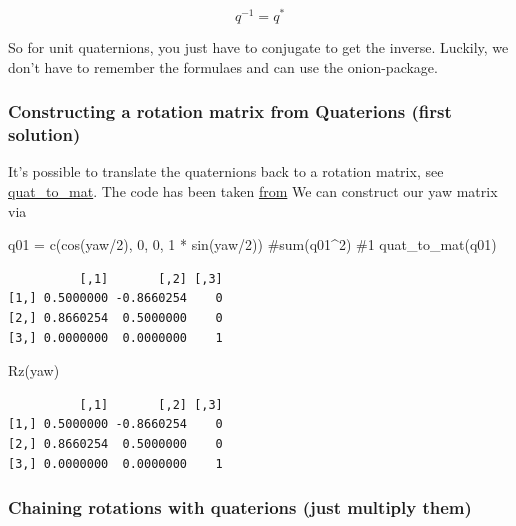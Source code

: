 \documentclass[
  letterpaper,
  DIV=11,
  numbers=noendperiod]{scrartcl}
\newenvironment{Shaded}{\begin{snugshade}}{\end{snugshade}}
\newcommand{\CommentTok}[1]{\textcolor[rgb]{0.37,0.37,0.37}{#1}}
\newcommand{\DecValTok}[1]{\textcolor[rgb]{0.68,0.00,0.00}{#1}}
\newcommand{\FunctionTok}[1]{\textcolor[rgb]{0.28,0.35,0.67}{#1}}
\newcommand{\NormalTok}[1]{\textcolor[rgb]{0.00,0.23,0.31}{#1}}
\newcommand{\OtherTok}[1]{\textcolor[rgb]{0.00,0.23,0.31}{#1}}
\newcommand{\SpecialCharTok}[1]{\textcolor[rgb]{0.37,0.37,0.37}{#1}}
\begin{document}
\[
q^{-1}=q^*
\]

So for unit quaternions, you just have to conjugate to get the inverse.
Luckily, we don't have to remember the formulaes and can use the
onion-package.

\hypertarget{constructing-a-rotation-matrix-from-quaterions-first-solution}{%
\subsubsection{Constructing a rotation matrix from Quaterions (first
solution)}\label{constructing-a-rotation-matrix-from-quaterions-first-solution}}

It's possible to translate the quaternions back to a rotation matrix,
see
\href{https://github.com/oduerr/gesture/blob/main/R/rotation_utils.R}{quat\_to\_mat}.
The code has been taken
\href{https://automaticaddison.com/how-to-convert-a-quaternion-to-a-rotation-matrix/}{from}
We can construct our yaw matrix via

\begin{Shaded}
\begin{Highlighting}[]
\NormalTok{  q01 }\OtherTok{=} \FunctionTok{c}\NormalTok{(}\FunctionTok{cos}\NormalTok{(yaw}\SpecialCharTok{/}\DecValTok{2}\NormalTok{), }\DecValTok{0}\NormalTok{, }\DecValTok{0}\NormalTok{, }\DecValTok{1} \SpecialCharTok{*} \FunctionTok{sin}\NormalTok{(yaw}\SpecialCharTok{/}\DecValTok{2}\NormalTok{))}
  \CommentTok{\#sum(q01\^{}2) \#1}
  \FunctionTok{quat\_to\_mat}\NormalTok{(q01)}
\end{Highlighting}
\end{Shaded}

\begin{verbatim}
          [,1]       [,2] [,3]
[1,] 0.5000000 -0.8660254    0
[2,] 0.8660254  0.5000000    0
[3,] 0.0000000  0.0000000    1
\end{verbatim}

\begin{Shaded}
\begin{Highlighting}[]
  \FunctionTok{Rz}\NormalTok{(yaw)}
\end{Highlighting}
\end{Shaded}

\begin{verbatim}
          [,1]       [,2] [,3]
[1,] 0.5000000 -0.8660254    0
[2,] 0.8660254  0.5000000    0
[3,] 0.0000000  0.0000000    1
\end{verbatim}

\hypertarget{chaining-rotations-with-quaterions-just-multiply-them}{%
\subsubsection{Chaining rotations with quaterions (just multiply
them)}\label{chaining-rotations-with-quaterions-just-multiply-them}}
\end{document}
